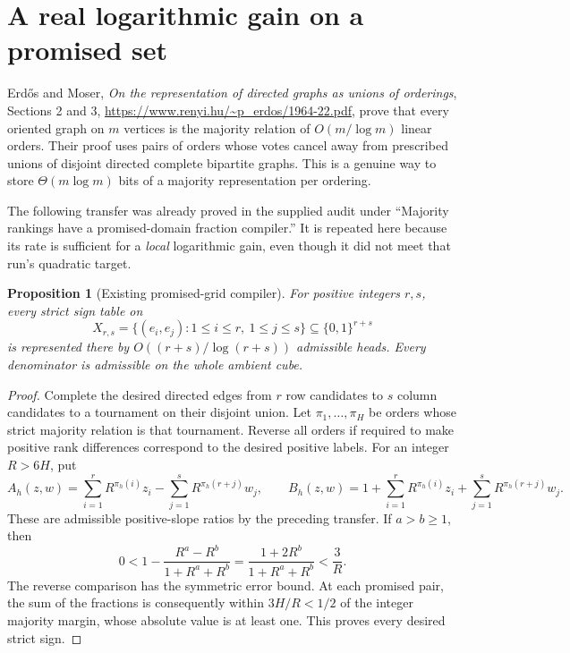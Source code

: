 \documentclass[11pt]{article}
\newtheorem{proposition}{Proposition}
\begin{document}
\section{A real logarithmic gain on a promised set}

Erd\H{o}s and Moser, \emph{On the representation of directed graphs
as unions of orderings}, Sections 2 and 3,
\url{https://www.renyi.hu/~p_erdos/1964-22.pdf}, prove that every
oriented graph on $m$ vertices is the majority relation of
$O(m/\log m)$ linear orders. Their proof uses pairs of orders whose
votes cancel away from prescribed unions of disjoint directed
complete bipartite graphs. This is a genuine way to store
$\Theta(m\log m)$ bits of a majority representation per ordering.

The following transfer was already proved in the supplied audit under
``Majority rankings have a promised-domain fraction compiler.'' It is
repeated here because its rate is sufficient for a \emph{local}
logarithmic gain, even though it did not meet that run's quadratic
target.

\begin{proposition}[Existing promised-grid compiler]
For positive integers $r,s$, every strict sign table on
\[
 X_{r,s}=\{(e_i,e_j):1\leq i\leq r,\ 1\leq j\leq s\}
 \subseteq\{0,1\}^{r+s}
\]
is represented there by $O((r+s)/\log(r+s))$ admissible heads.
Every denominator is admissible on the whole ambient cube.
\end{proposition}
\begin{proof}
Complete the desired directed edges from $r$ row candidates to $s$
column candidates to a tournament on their disjoint union. Let
$\pi_1,\ldots,\pi_H$ be orders whose strict majority relation is
that tournament. Reverse all orders if required to make positive
rank differences correspond to the desired positive labels.
For an integer $R>6H$, put
\[
 A_h(z,w)=\sum_{i=1}^r R^{\pi_h(i)}z_i
                -\sum_{j=1}^s R^{\pi_h(r+j)}w_j,
 \qquad
 B_h(z,w)=1+\sum_{i=1}^r R^{\pi_h(i)}z_i
                +\sum_{j=1}^s R^{\pi_h(r+j)}w_j.
\]
These are admissible positive-slope ratios by the preceding transfer.
If $a>b\geq1$, then
\[
 0<1-\frac{R^a-R^b}{1+R^a+R^b}
   =\frac{1+2R^b}{1+R^a+R^b}<\frac3R.
\]
The reverse comparison has the symmetric error bound. At each
promised pair, the sum of the fractions is consequently within
$3H/R<1/2$ of the integer majority margin, whose absolute value is
at least one. This proves every desired strict sign.
\end{proof}
\end{document}
